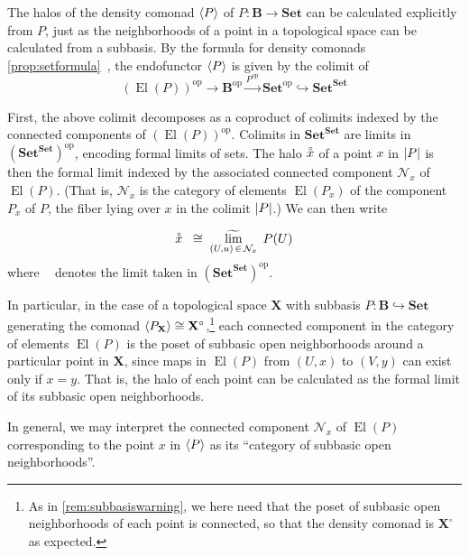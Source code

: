 \documentclass[11pt, oneside, article]{memoir}
\theoremstyle{plain}
\theoremstyle{definition}
\theoremstyle{remark}
\newenvironment{remark}
{\renewcommand\qedsymbol{$\lrcorner$}%
  \pushQED{\qed}\myremark}
{\popQED\endmyremark}
\DeclareMathOperator{\El}{El}
\DeclareMathOperator{\ophelper}{op}
\newcommand{\flim}{\mathop{\widetilde{\mathrm{lim}}}}
\DeclarePairedDelimiter{\gen}{\langle}{\rangle}
\DeclarePairedDelimiter{\abs}{\lvert}{\rvert}
\newcommand{\op}{^{\ophelper}}
\newcommand{\xto}[1]{\xrightarrow{#1}}
\newcommand{\namedcat}[1]{\mathbf{#1}}
\newcommand{\cat}[1]{\mathbf{#1}}
\newcommand{\spa}[1]{\mathbf{#1}}
\newcommand{\Set}{\namedcat{Set}}
\newcommand{\pts}[1]{{\abs{#1}}}
\newcommand{\halo}[1]{\accentset{\circ}{#1}}
\newcommand{\ph}[1]{#1}
\newcommand{\fun}[2]{{#2}^{#1}}
\newcommand{\topbasis}[1]{\pP_{#1}}
\newcommand{\End}[1]{\fun{#1}{#1}}
\newcommand{\SetSet}{\End{\Set}}
\newcommand{\bB}{\cat{B}}
\newcommand{\pP}{\ph{P}}
\newcommand{\cP}{\gen{\pP}}
\newcommand{\tX}{\spa{X}}
\newcommand{\cX}{\toptocmd{\tX}}
\newcommand{\toptocmd}[1]{{{#1}^\circ}}
\newcommand{\neighbors}[1]{\mathcal{N}_{#1}}
\begin{document}
\begin{remark}[Subbases]\label{rem:subbasishalo}
  The halos of the density comonad $\cP$ of $\pP \colon \bB \to \Set$
  can be calculated explicitly from $\pP$, just as the neighborhoods
  of a point in a topological space can be calculated from a
  subbasis. By the formula for density comonads
  \cref{prop:setformula}~, the endofunctor
  $\cP$ is given by the colimit of
  \[
    (\El(\pP))\op\to\bB\op\xto{\pP\op}\Set\op\hookrightarrow\SetSet
  \]
  

  First, the above colimit decomposes as a coproduct of colimits
  indexed by the connected components of $(\El(\pP))\op$. Colimits in
  $\SetSet$ are limits in $(\SetSet)\op$, encoding formal limits of
  sets. The halo $\halo{x}$ of a point $x$ in $\pts{\pP}$ is then the
  formal limit indexed by the associated connected component
  $\neighbors{x}$ of $\El(\pP)$. (That is, $\neighbors{x}$ is the
  category of elements $\El(\pP_x)$ of the component $\pP_x$ of $\pP$,
  the fiber lying over $x$ in the colimit $\pts{\pP}$.) We can then
  write

  \[
    \halo{x} \;\; \cong \; \flim_{(U, u)\, \in \,\neighbors{x}} \; \pP(U)
  \]
  where $\flim$ denotes the limit taken in $(\SetSet)\op$.

  In particular, in the case of a topological space $\tX$ with
  subbasis $\pP \colon \bB \hookrightarrow \Set$ generating the
  comonad $\gen{\topbasis{\tX}} \cong \cX$,\footnote{As in
    \cref{rem:subbasiswarning}, we here need that the poset of
    subbasic open neighborhoods of each point is connected, so that
    the density comonad is $\cX$ as expected.} each connected
  component in the category of elements $\El(\pP)$ is the poset of
  subbasic open neighborhoods around a particular point in $\tX$,
  since maps in $\El(\pP)$ from $(U,x)$ to $(V,y)$ can exist only if
  $x=y$. That is, the halo of each point can be calculated as the
  formal limit of its subbasic open neighborhoods.

  In general, we may interpret the connected component $\neighbors{x}$
  of $\El(\pP)$ corresponding to the point $x$ in $\cP$ as its
  ``category of subbasic open neighborhoods''.
\end{remark}
\end{document}
